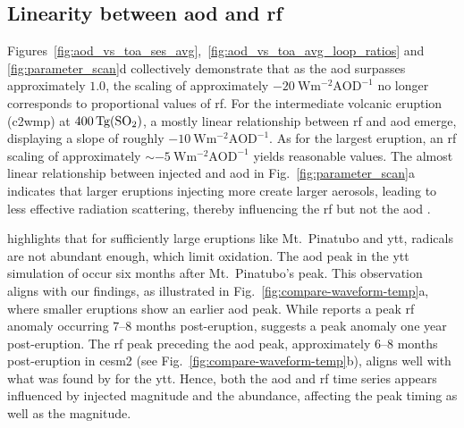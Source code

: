 \documentclass{ametsocV6.1}
\newcommand{\iso}[1][i]{{#1}njected \ce{SO2}}
\begin{document}

\subsection{Linearity between \gls{aod} and \gls{rf}}

Figures~\ref{fig:aod_vs_toa_ses_avg},~\ref{fig:aod_vs_toa_avg_loop_ratios} and
\ref{fig:parameter_scan}d collectively demonstrate that as the \gls{aod} surpasses
approximately \(1.0\), the scaling of approximately
\(\SI{-20}{\watt\metre^{-2}\mathrm{AOD}^{-1}}\) no longer corresponds to proportional
values of \gls{rf}. For the intermediate volcanic eruption (\gls{c2wmp}) at
\(\SI{400}{\tera\gram(\ce{SO2})}\), a mostly linear relationship between \gls{rf} and
\gls{aod} emerge, displaying a slope of roughly
\(\SI{-10}{\watt\metre^{-2}\mathrm{AOD}^{-1}}\). As for the largest eruption, an
\gls{rf} scaling of approximately \(\sim \SI{-5}{\watt\metre^{-2}\mathrm{AOD}^{-1}}\)
yields reasonable values. The almost linear relationship between \iso{} and \gls{aod} in
Fig.~\ref{fig:parameter_scan}a indicates that larger eruptions injecting more 
create larger aerosols, leading to less effective radiation scattering, thereby
influencing the \gls{rf} but not the \gls{aod} \citep{english2013, timmreck2010,
  timmreck2018}.

\citet{timmreck2010} highlights that for sufficiently large eruptions like Mt.\ Pinatubo
and \gls{ytt},  radicals are not abundant enough, which limit  oxidation.
The \gls{aod} peak in the \gls{ytt} simulation of \citet{timmreck2010} occur six months
after Mt.\ Pinatubo's peak. This observation aligns with our findings, as illustrated in
Fig.~\ref{fig:compare-waveform-temp}a, where smaller eruptions show an earlier \gls{aod}
peak. While \citet{timmreck2010} reports a peak \gls{rf} anomaly occurring \(7\)--\(8\)
months post-eruption, \citet{jones2005} suggests a peak anomaly one year post-eruption.
The \gls{rf} peak preceding the \gls{aod} peak, approximately \(6\)--\(8\) months
post-eruption in \gls{cesm2} (see Fig.~\ref{fig:compare-waveform-temp}b), aligns well
with what was found by \citet{timmreck2010} for the \gls{ytt}. Hence, both the \gls{aod}
and \gls{rf} time series appears influenced by \iso{} magnitude and the 
abundance, affecting the peak timing as well as the magnitude.
\end{document}
